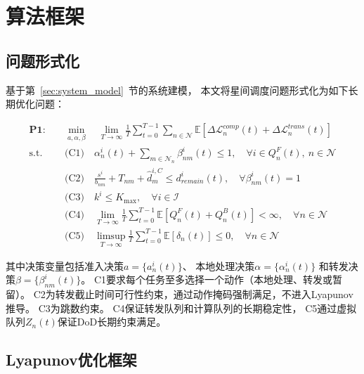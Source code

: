 \documentclass[a4paper,11pt]{article}
\begin{document}
\section{算法框架}
\label{sec:algorithm}

\subsection{问题形式化}

基于第~\ref{sec:system_model}~节的系统建模，
本文将星间调度问题形式化为如下长期优化问题：

\begin{equation}
\begin{aligned}
\mathbf{P1:} \quad &\min_{a,\alpha,\beta} \quad
\lim_{T \to \infty} \frac{1}{T} \sum_{t=0}^{T-1}
\sum_{n \in \mathcal{N}} \mathbb{E}\left[
\Delta\mathcal{L}^{comp}_n(t) + \Delta\mathcal{L}^{trans}_n(t)
\right] \\
\text{s.t.} \quad
&\text{(C1)} \quad \alpha^i_n(t) + \sum_{m \in \mathcal{N}_n}
\beta^i_{nm}(t) \leq 1,
\quad \forall i \in Q^F_n(t),\ n \in \mathcal{N} \\
&\text{(C2)} \quad \frac{s^i}{b_{nm}} + T_{nm}
+ \hat{d}^{i,C}_m \leq d^i_{remain}(t),
\quad \forall \beta^i_{nm}(t)=1 \\
&\text{(C3)} \quad k^i \leq K_{\max},
\quad \forall i \in \mathcal{I} \\
&\text{(C4)} \quad \lim_{T\to\infty} \frac{1}{T}
\sum_{t=0}^{T-1} \mathbb{E}[Q^F_n(t) + Q^B_n(t)] < \infty,
\quad \forall n \in \mathcal{N} \\
&\text{(C5)} \quad \limsup_{T\to\infty}\frac{1}{T}
\sum_{t=0}^{T-1}\mathbb{E}[\delta_n(t)] \leq 0,
\quad \forall n \in \mathcal{N}
\end{aligned}
\label{eq:P1}
\end{equation}

其中决策变量包括准入决策$a = \{a^i_n(t)\}$、
本地处理决策$\alpha = \{\alpha^i_n(t)\}$
和转发决策$\beta = \{\beta^i_{nm}(t)\}$。
C1要求每个任务至多选择一个动作（本地处理、转发或暂留）。
C2为转发截止时间可行性约束，通过动作掩码强制满足，不进入Lyapunov推导。
C3为跳数约束。
C4保证转发队列和计算队列的长期稳定性，
C5通过虚拟队列$Z_n(t)$保证DoD长期约束满足。

\subsection{Lyapunov优化框架}
\end{document}
